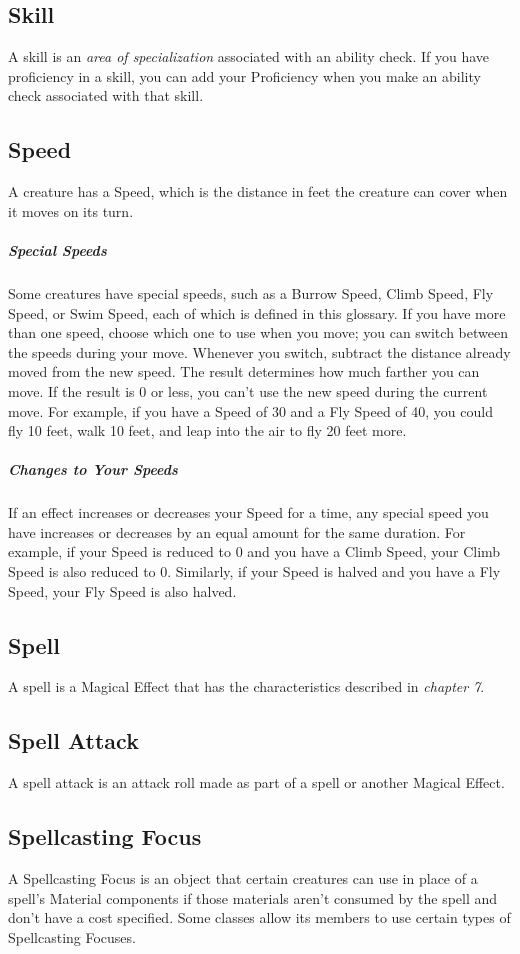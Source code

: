 \documentclass[10pt,a4paper,twoside,bg=print,twocolumn,openany,nodeprecatedcode]{dndarticle}
\begin{document}
\subsection{Skill}
A skill is an \textit{area of specialization} associated with an ability check. If you have proficiency in a skill, you can add your Proficiency when you make an ability check associated with that skill.

\subsection{Speed}
A creature has a Speed, which is the distance in feet the creature can cover when it moves on its turn.

\subparagraph{Special Speeds}
Some creatures have special speeds, such as a Burrow Speed, Climb Speed, Fly Speed, or Swim Speed, each of which is defined in this glossary. If you have more than one speed, choose which one to use when you move; you can switch between the speeds during your move. Whenever you switch, subtract the distance already moved from the new speed. The result determines how much farther you can move. If the result is 0 or less, you can't use the new speed during the current move. For example, if you have a Speed of 30 and a Fly Speed of 40, you could fly 10 feet, walk 10 feet, and leap into the air to fly 20 feet more.

\subparagraph{Changes to Your Speeds}
If an effect increases or decreases your Speed for a time, any special speed you have increases or decreases by an equal amount for the same duration. For example, if your Speed is reduced to 0 and you have a Climb Speed, your Climb Speed is also reduced to 0. Similarly, if your Speed is halved and you have a Fly Speed, your Fly Speed is also halved.

\subsection{Spell}
A spell is a Magical Effect that has the characteristics described in \textit{chapter 7}.

\subsection{Spell Attack}
A spell attack is an attack roll made as part of a spell or another Magical Effect.

\subsection{Spellcasting Focus}
A Spellcasting Focus is an object that certain creatures can use in place of a spell's Material components if those materials aren't consumed by the spell and don't have a cost specified. Some classes allow its members to use certain types of Spellcasting Focuses.
\end{document}
